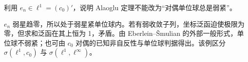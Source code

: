 \begin{exercise}[弱星紧并非弱紧]\label{ex:y5-compactness}
利用 $e_n\in\ell^1=(c_0)'$，说明 Alaoglu 定理不能改为“对偶单位球总是弱紧”。
\end{exercise}
\begin{solution}
$e_n$ 弱星趋零，所以处于弱星紧单位球内。若有弱收敛子列，坐标泛函迫使极限为零，但求和泛函在其上恒为 1，矛盾。由 Eberlein--\v Smulian 的外部一般形式，单位球不弱紧；也可由 $c_0$ 对偶的已知非自反性与单位球判据得出。该例区分 $\sigma(\ell^1,c_0)$ 与 $\sigma(\ell^1,\ell^\infty)$。
\end{solution}
